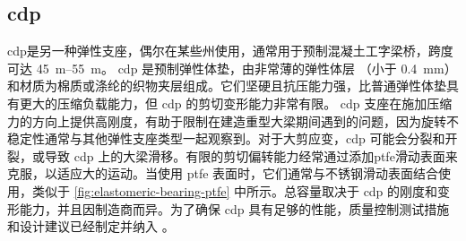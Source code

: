 \subsection{\texorpdfstring{\acrfull*{cdp}}{棉鸭垫（CDP）}}
\acrfull{cdp}是另一种弹性支座，偶尔在某些州使用，通常用于预制混凝土工字梁桥，跨度可达 \qtyrange{45}{55}{m}。 \acrshort{cdp} 是预制弹性体垫，由非常薄的弹性体层 （小于 \qty{0.4}{mm}）和材质为棉质或涤纶的织物夹层组成。它们坚硬且抗压能力强，比普通弹性体垫具有更大的压缩负载能力，但 \acrshort{cdp} 的剪切变形能力非常有限。 \acrshort{cdp} 支座在施加压缩力的方向上提供高刚度，有助于限制在建造重型大梁期间遇到的问题，因为旋转不稳定性通常与其他弹性支座类型一起观察到。对于大剪应变，\acrshort{cdp} 可能会分裂和开裂，或导致 \acrshort{cdp} 上的大梁滑移。有限的剪切偏转能力经常通过添加\acrfull{ptfe}滑动表面来克服，以适应大的运动。当使用 \acrshort{ptfe} 表面时，它们通常与不锈钢滑动表面结合使用，类似于 \cref{fig:elastomeric-bearing-ptfe} 中所示。总容量取决于 \acrshort{cdp} 的刚度和变形能力，并且因制造商而异。为了确保 \acrshort{cdp} 具有足够的性能，质量控制测试措施和设计建议已经制定并纳入 \lrfd。\cite{lehmann2003c}


